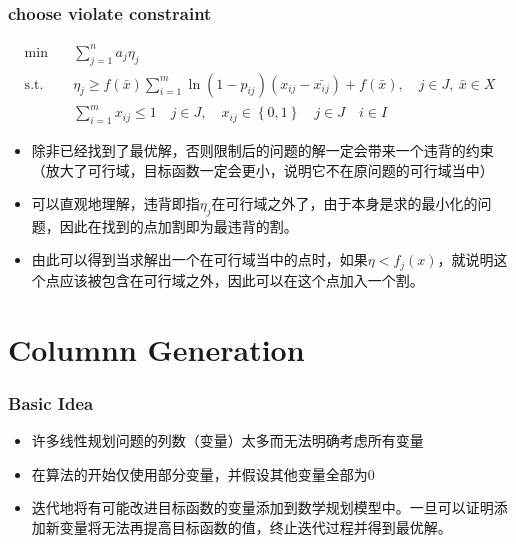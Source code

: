 \documentclass[CJK,10pt]{beamer}
\begin{document}
\begin{frame}
    \frametitle{choose violate constraint}
    {
    \scriptsize
    \begin{align*}
        \min\quad & \sum_{j=1}^n a_j \eta_j \\ 
        \mathrm{s. t.}\quad & \eta_j \geq f(\bar{x})\sum_{i = 1}^m \ln(1-p_{ij})(x_{ij} - \bar{x_{ij}}) + f(\bar{x}), \quad j \in J,\ \bar{x} \in X \\ 
        &\sum_{i=1}^m x_{ij} \leq 1\quad j \in J,\quad x_{ij} \in \left\{ 0,1 \right\} \quad j\in J\quad i \in I
    \end{align*}
    \begin{itemize}
        \item 除非已经找到了最优解，否则限制后的问题的解一定会带来一个违背的约束（放大了可行域，目标函数一定会更小，说明它不在原问题的可行域当中）
        \item 可以直观地理解，违背即指$\eta_j$在可行域之外了，由于本身是求的最小化的问题，因此在找到的点加割即为最违背的割。
        \item 由此可以得到当求解出一个在可行域当中的点时，如果$\eta < f_j(x)$，就说明这个点应该被包含在可行域之外，因此可以在这个点加入一个割。
    \end{itemize}
    }
\end{frame}


\section{Columnn Generation}
\begin{frame}
    \frametitle{Basic Idea}
    \begin{itemize}
        \item 许多线性规划问题的列数（变量）太多而无法明确考虑所有变量
        \item 在算法的开始仅使用部分变量，并假设其他变量全部为0
        \item 迭代地将有可能改进目标函数的变量添加到数学规划模型中。一旦可以证明添加新变量将无法再提高目标函数的值，终止迭代过程并得到最优解。
    \end{itemize}
\end{frame}
\end{document}
